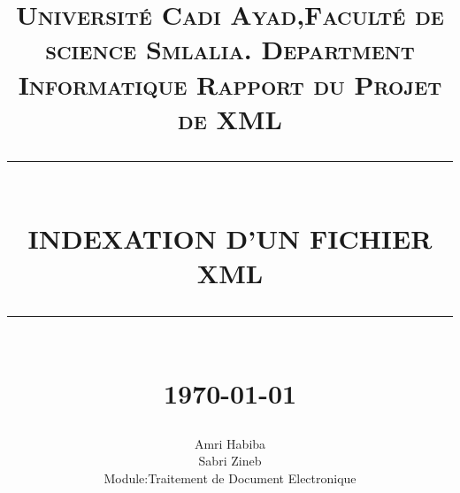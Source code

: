 \documentclass[12pt]{report}
\newcommand{\HRule}[1]{\rule{\linewidth}{#1}}
\begin{document}
\title{ \normalsize \textsc{Université Cadi Ayad,Faculté de              science Smlalia.
        Department Informatique
        Rapport du Projet de XML}
        \\ [2.0cm]
        \HRule{0.5pt} \\
        \LARGE \textbf{\uppercase{Indexation d'un fichier XML}}
        \HRule{2pt} \\ [0.5cm]
        \normalsize \today \vspace*{5\baselineskip}}

\date{}

\author{
        Amri Habiba  \\ 
        Sabri Zineb \\
        Module:Traitement de Document Electronique }

\maketitle
\tableofcontents
\newpage

\sectionfont{\scshape}



\newpage
\end{document}
